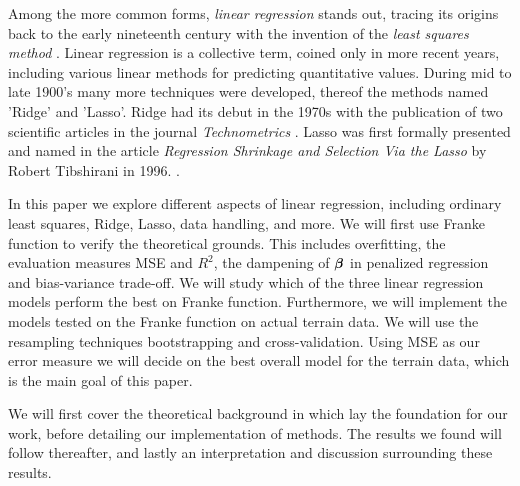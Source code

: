 Among the more common forms, \textit{linear regression} stands out, tracing its origins back to the early nineteenth century with the invention of the \textit{least squares method} \citep[ p.~5]{james}. 
Linear regression is a collective term, coined only in more recent years, including various linear methods for predicting quantitative values. During mid to late 1900's many more techniques were developed, thereof the methods named 'Ridge' and 'Lasso'. Ridge had its debut in the 1970s with the publication of two scientific articles in the journal \textit{Technometrics} \cite{hoerl}. Lasso was first formally presented and named in the article \textit{Regression Shrinkage and Selection Via the Lasso} by Robert Tibshirani in 1996. \cite{tibshirani}. 


In this paper we explore different aspects of linear regression, including ordinary least squares, Ridge, Lasso, data handling, and more. 
We will first use Franke function to verify the theoretical grounds. This includes overfitting, the evaluation measures MSE and $R^2$, the dampening of $\boldsymbol{\beta}$ in penalized regression and bias-variance trade-off. 
We will study which of the three linear regression models perform the best on Franke function.
Furthermore, we will implement the models tested on the Franke function on actual terrain data. 
We will use the resampling techniques bootstrapping and cross-validation. 
Using MSE as our error measure we will decide on the best overall model for the terrain data, which is the main goal of this paper. 


We will first cover the theoretical background in which lay the foundation for our work, before detailing our implementation of methods. 
The results we found will follow thereafter, and lastly an interpretation and discussion surrounding these results. 

